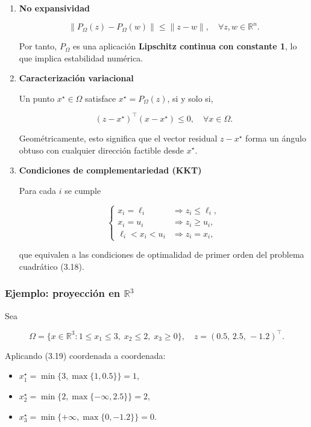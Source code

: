 \documentclass[
  spanish,
  us-letterpaper,
  DIV=11,
  numbers=noendperiod]{scrreprt}
\providecommand{\tightlist}{%
  \setlength{\itemsep}{0pt}\setlength{\parskip}{0pt}}
\numberwithin{equation}{section}
\begin{document}
\begin{enumerate}
\def\labelenumi{\arabic{enumi}.}
\item
  \textbf{No expansividad}

  \[
  \|P_\Omega(z) - P_\Omega(w)\| \le \|z - w\|, \quad \forall z,w \in \mathbb{R}^n. \tag{3.20}
  \]

  Por tanto, \(P_\Omega\) es una aplicación \textbf{Lipschitz continua
  con constante 1}, lo que implica estabilidad numérica.
\item
  \textbf{Caracterización variacional}

  Un punto \(x^\star \in \Omega\) satisface \(x^\star = P_\Omega(z)\),
  si y solo si,

  \[
  (z - x^\star)^\top (x - x^\star) \le 0, \quad \forall x \in \Omega. \tag{3.21}
  \]

  Geométricamente, esto significa que el vector residual \(z - x^\star\)
  forma un ángulo obtuso con cualquier dirección factible desde
  \(x^\star\).
\item
  \textbf{Condiciones de complementariedad (KKT)}

  Para cada \(i\) se cumple

  \[
  \begin{cases}
  x_i = \ell_i &\Rightarrow z_i \le \ell_i,\\[4pt]
  x_i = u_i &\Rightarrow z_i \ge u_i,\\[4pt]
  \ell_i < x_i < u_i &\Rightarrow z_i = x_i,
  \end{cases} \tag{3.22}
  \]

  que equivalen a las condiciones de optimalidad de primer orden del
  problema cuadrático (3.18).
\end{enumerate}

\subsubsection{\texorpdfstring{Ejemplo: proyección en
\(\mathbb{R}^3\)}{Ejemplo: proyección en \textbackslash mathbb\{R\}\^{}3}}\label{ejemplo-proyecciuxf3n-en-mathbbr3}

Sea

\[
\Omega = \{x \in \mathbb{R}^3 : 1 \le x_1 \le 3,\; x_2 \le 2,\; x_3 \ge 0\},
\quad z = (0.5,\, 2.5,\, -1.2)^\top.
\]

Aplicando (3.19) coordenada a coordenada:

\begin{itemize}
\tightlist
\item
  \(x_1^\star = \min\{3, \max\{1, 0.5\}\} = 1\),
\item
  \(x_2^\star = \min\{2, \max\{-\infty, 2.5\}\} = 2\),
\item
  \(x_3^\star = \min\{+\infty, \max\{0, -1.2\}\} = 0\).
\end{itemize}
\end{document}
